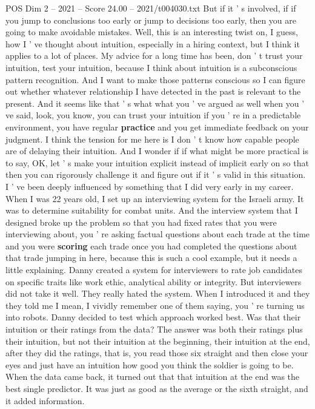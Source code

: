 \begin{textsample}{POS Dim 2 – 2021 – Score 24.00 – 2021/t004030.txt}
But if it ' s involved, if if you jump to conclusions too early or jump to decisions too early, then you are going to make avoidable mistakes.
Well, this is an interesting twist on, I guess, how I ' ve thought about intuition, especially in a hiring context, but I think it applies to a lot of places.
My advice for a long time has been, don ' t trust your intuition, test your intuition, because I think about intuition is a subconscious pattern recognition.
And I want to make those patterns conscious so I can figure out whether whatever relationship I have detected in the past is relevant to the present.
And it seems like that ' s what what you ' ve argued as well when you ' ve said, look, you know, you can trust your intuition if you ' re in a predictable environment, you have regular \textbf{practice} and you get immediate feedback on your judgment.
I think the tension for me here is I don ' t know how capable people are of delaying their intuition.
And I wonder if if what might be more practical is to say, OK, let ' s make your intuition explicit instead of implicit early on so that then you can rigorously challenge it and figure out if it ' s valid in this situation.
I ' ve been deeply influenced by something that I did very early in my career.
When I was 22 years old, I set up an interviewing system for the Israeli army.
It was to determine suitability for combat units.
And the interview system that I designed broke up the problem so that you had fixed rates that you were interviewing about, you ' re asking factual questions about each trade at the time and you were \textbf{scoring} each trade once you had completed the questions about that trade jumping in here, because this is such a cool example, but it needs a little explaining.
Danny created a system for interviewers to rate job candidates on specific traits like work ethic, analytical ability or integrity.
But interviewers did not take it well.
They really hated the system.
When I introduced it and they they told me I mean, I vividly remember one of them saying, you ' re turning us into robots.
Danny decided to test which approach worked best.
Was that their intuition or their ratings from the data?
The answer was both their ratings plus their intuition, but not their intuition at the beginning, their intuition at the end, after they did the ratings, that is, you read those six straight and then close your eyes and just have an intuition how good you think the soldier is going to be.
When the data came back, it turned out that that intuition at the end was the best single predictor.
It was just as good as the average or the sixth straight, and it added information.

\end{textsample}
